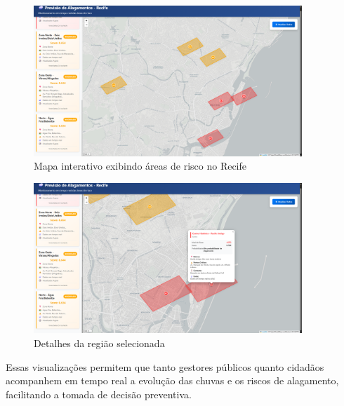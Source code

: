 \begin{figure}[H]
  \centering
  \includegraphics[width=0.9\textwidth]{figuras/dashboard.png}
  \caption{Mapa interativo exibindo áreas de risco no Recife}
  \label{fig:dashboard-mapa}
\end{figure}

\begin{figure}[H]
  \centering
  \includegraphics[width=0.9\textwidth]{figuras/dash-figura.png}
  \caption{Detalhes da região selecionada}
  \label{fig:dashboard-alertas}
\end{figure}


Essas visualizações permitem que tanto gestores públicos quanto cidadãos acompanhem em tempo real a evolução das chuvas e os riscos de alagamento, facilitando a tomada de decisão preventiva.
